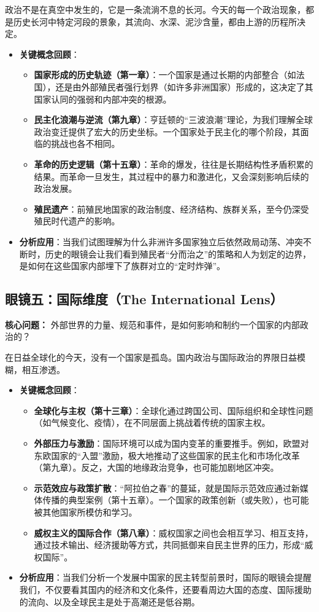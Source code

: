 政治不是在真空中发生的，它是一条流淌不息的长河。今天的每一个政治现象，都是历史长河中特定河段的景象，其流向、水深、泥沙含量，都由上游的历程所决定。
\begin{itemize}
    \item \textbf{关键概念回顾}：
    \begin{itemize}
        \item \textbf{国家形成的历史轨迹（第一章）}：一个国家是通过长期的内部整合（如法国），还是由外部殖民者强行划界（如许多非洲国家）形成的，这决定了其国家认同的强弱和内部冲突的根源。
        \item \textbf{民主化浪潮与逆流（第九章）}：亨廷顿的“三波浪潮”理论，为我们理解全球政治变迁提供了宏大的历史坐标。一个国家处于民主化的哪个阶段，其面临的挑战也各不相同。
        \item \textbf{革命的历史逻辑（第十五章）}：革命的爆发，往往是长期结构性矛盾积累的结果。而革命一旦发生，其过程中的暴力和激进化，又会深刻影响后续的政治发展。
        \item \textbf{殖民遗产}：前殖民地国家的政治制度、经济结构、族群关系，至今仍深受殖民时代遗产的影响。
    \end{itemize}
    \item \textbf{分析应用}：当我们试图理解为什么非洲许多国家独立后依然政局动荡、冲突不断时，历史的眼镜会让我们看到殖民者“分而治之”的策略和人为划定的边界，是如何在这些国家内部埋下了族群对立的“定时炸弹”。
\end{itemize}

\subsection{眼镜五：国际维度（The International Lens）}
\textbf{核心问题：} 外部世界的力量、规范和事件，是如何影响和制约一个国家的内部政治的？

在日益全球化的今天，没有一个国家是孤岛。国内政治与国际政治的界限日益模糊，相互渗透。
\begin{itemize}
    \item \textbf{关键概念回顾}：
    \begin{itemize}
        \item \textbf{全球化与主权（第十三章）}：全球化通过跨国公司、国际组织和全球性问题（如气候变化、疫情），在不同层面上挑战着传统的国家主权。
        \item \textbf{外部压力与激励}：国际环境可以成为国内变革的重要推手。例如，欧盟对东欧国家的“入盟”激励，极大地推动了这些国家的民主化和市场化改革（第九章）。反之，大国的地缘政治竞争，也可能加剧地区冲突。
        \item \textbf{示范效应与政策扩散}：“阿拉伯之春”的蔓延，就是国际示范效应通过新媒体传播的典型案例（第十五章）。一个国家的政策创新（或失败），也可能被其他国家所模仿和学习。
        \item \textbf{威权主义的国际合作（第八章）}：威权国家之间也会相互学习、相互支持，通过技术输出、经济援助等方式，共同抵御来自民主世界的压力，形成“威权国际”。
    \end{itemize}
    \item \textbf{分析应用}：当我们分析一个发展中国家的民主转型前景时，国际的眼镜会提醒我们，不仅要看其国内的经济和文化条件，还要看周边大国的态度、国际援助的流向、以及全球民主是处于高潮还是低谷期。
\end{itemize}

